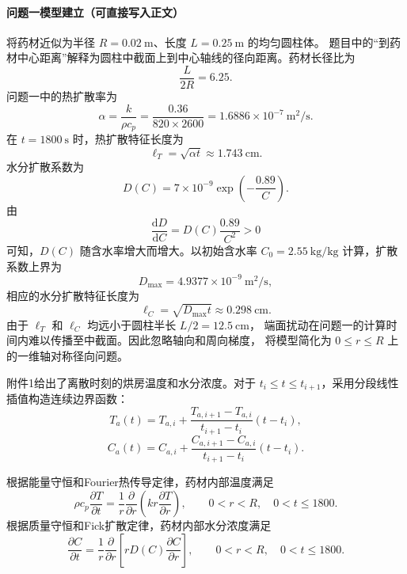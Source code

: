 \documentclass[12pt,a4paper]{article}
\begin{document}
\paragraph{问题一模型建立（可直接写入正文）}
将药材近似为半径 $R=0.02\ \mathrm{m}$、长度 $L=0.25\ \mathrm{m}$ 的均匀圆柱体。
题目中的“到药材中心距离”解释为圆柱中截面上到中心轴线的径向距离。药材长径比为
\begin{equation}
\frac{L}{2R}=6.25.
\end{equation}
问题一中的热扩散率为
\begin{equation}
\alpha=\frac{k}{\rho c_p}
 =\frac{0.36}{820\times2600}
 =1.6886\times10^{-7}\ \mathrm{m^2/s}.
\end{equation}
在 $t=1800\ \mathrm{s}$ 时，热扩散特征长度为
\begin{equation}
\ell_T=\sqrt{\alpha t}\approx1.743\ \mathrm{cm}.
\end{equation}
水分扩散系数为
\begin{equation}
D(C)=7\times10^{-9}\exp\left(-\frac{0.89}{C}\right).
\end{equation}
由
\begin{equation}
\frac{\mathrm dD}{\mathrm dC}=D(C)\frac{0.89}{C^2}>0
\end{equation}
可知，$D(C)$ 随含水率增大而增大。以初始含水率
$C_0=2.55\ \mathrm{kg/kg}$ 计算，扩散系数上界为
\begin{equation}
D_{\max}=4.9377\times10^{-9}\ \mathrm{m^2/s},
\end{equation}
相应的水分扩散特征长度为
\begin{equation}
\ell_C=\sqrt{D_{\max}t}\approx0.298\ \mathrm{cm}.
\end{equation}
由于 $\ell_T$ 和 $\ell_C$ 均远小于圆柱半长 $L/2=12.5\ \mathrm{cm}$，
端面扰动在问题一的计算时间内难以传播至中截面。因此忽略轴向和周向梯度，
将模型简化为 $0\le r\le R$ 上的一维轴对称径向问题。

附件1给出了离散时刻的烘房温度和水分浓度。对于
$t_i\le t\le t_{i+1}$，采用分段线性插值构造连续边界函数：
\begin{equation}
T_a(t)=T_{a,i}+\frac{T_{a,i+1}-T_{a,i}}{t_{i+1}-t_i}(t-t_i),
\end{equation}
\begin{equation}
C_a(t)=C_{a,i}+\frac{C_{a,i+1}-C_{a,i}}{t_{i+1}-t_i}(t-t_i).
\end{equation}

根据能量守恒和Fourier热传导定律，药材内部温度满足
\begin{equation}
\boxed{
\rho c_p\frac{\partial T}{\partial t}
=\frac{1}{r}\frac{\partial}{\partial r}
\left(kr\frac{\partial T}{\partial r}\right)},
\qquad 0<r<R,\quad 0<t\le1800.
\label{eq:merged-q1-heat}
\end{equation}
根据质量守恒和Fick扩散定律，药材内部水分浓度满足
\begin{equation}
\boxed{
\frac{\partial C}{\partial t}
=\frac{1}{r}\frac{\partial}{\partial r}
\left[rD(C)\frac{\partial C}{\partial r}\right]},
\qquad 0<r<R,\quad 0<t\le1800.
\label{eq:merged-q1-moisture}
\end{equation}
\end{document}
